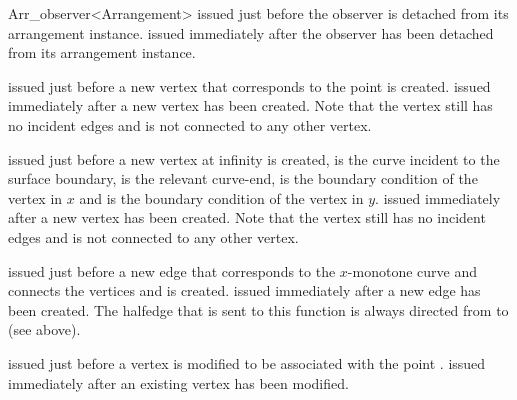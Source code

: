 \begin{ccRefClass}{Arr_observer<Arrangement>}
    {issued just before the observer is detached from its arrangement instance.}
\ccGlue
{}
    {issued immediately after the observer has been detached from its
     arrangement instance.}



    {issued just before a new vertex that corresponds to the point 
     is created.}
\ccGlue
{}
    {issued immediately after a new vertex  has been created.
     Note that the vertex still has no incident edges and is not connected
     to any other vertex.}

    {issued just before a new vertex at infinity is created,  is the
    curve incident to the surface boundary,  is the relevant curve-end,
     is the boundary condition of the vertex in $x$ and 
     is the boundary condition of the vertex in $y$.}
\ccGlue
{}
    {issued immediately after a new vertex  has been created.
     Note that the vertex still has no incident edges and is not connected
     to any other vertex.}

    {issued just before a new edge that corresponds to the $x$-monotone curve 
      and connects the vertices  and  is created.}
\ccGlue
{}
    {issued immediately after a new edge  has been created.
     The halfedge that is sent to this function is always directed from 
      to  (see above).}

    {issued just before a vertex  is modified to be associated with
     the point .}
\ccGlue
{}
    {issued immediately after an existing vertex  has been modified.}


\end{ccRefClass}
